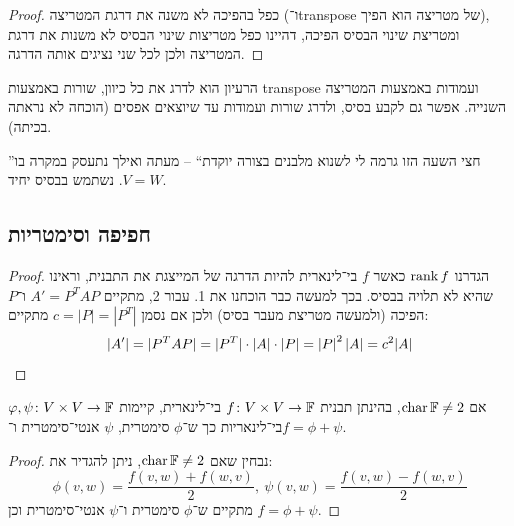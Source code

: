 \documentclass[name=רשימות אלגברה לינארית 2א]{../../../tex/classes/megasumPreamble}
\begin{document}
	\begin{proof}
		כפל בהפיכה לא משנה את דרגת המטריצה (ו־transpose של מטריצה הוא הפיך), ומטריצת שינוי הבסיס הפיכה, דהיינו כפל מטריצות שינוי הבסיס לא משנות את דרגת המטריצה ולכן לכל שני נציגים אותה הדרגה. 
	\end{proof}
	
	הרעיון הוא לדרג את כל כיוון, שורות באמצעות transpose ועמודות באמצעות המטריצה השנייה. אפשר גם לקבע בסיס, ולדרג שורות ועמודות עד שיוצאים אפסים (הוכחה לא נראתה בכיתה). 
	
	''חצי השעה הזו גרמה לי לשנוא מלבנים בצורה יוקדת`` – מעתה ואילך נתעסק במקרה בו $V = W$. נשתמש בבסיס יחיד. 
	
	\subsection{חפיפה וסימטריות}
	\begin{proof}
		הגדרנו $\operatorname{rank} f$ כאשר $f$ בי־לינארית להיות הדרגה של המייצגת את התבנית, וראינו שהיא לא תלויה בבסיס. בכך למעשה כבר הוכחנו את 1. עבור 2, מתקיים $A' = P^TAP$ ו־$P$ הפיכה (ולמעשה מטריצת מעבר בסיס) ולכן אם נסמן $c = |P| = |P^T|$ מתקיים: 
		\[ |A'| = |P^TAP| = |P^T| \cdot |A| \cdot |P| = \left \lvert P \right \rvert^2\left \lvert A \right \rvert = c^2 |A| \]
	\end{proof}
	
	\begin{Theorem}
		אם $\operatorname{char} \mathbb{F} \neq 2$, בהינתן תבנית $f \colon V \times V \to \mathbb{F}$ בי־לינארית, קיימות $\varphi, \psi \colon V\times V \to \mathbb{F}$ בי־לינאריות כך ש־$\phi$ סימטרית, $\psi$ אנטי־סימטרית ו־$f = \phi + \psi$. 
	\end{Theorem}
	\begin{proof}
		נבחין שאם $\operatorname{char} \mathbb{F} \neq 2$, ניתן להגדיר את: 
		\[ \phi(v, w) = \frac{f(v, w) + f(w, v)}{2}, \ \psi(v, w) = \frac{f(v, w) - f(w, v)}{2} \]
		מתקיים ש־$\phi$ סימטרית ו־$\psi$ אנטי־סימטרית וכן $f = \phi + \psi$. 
	\end{proof}
	
\end{document}
